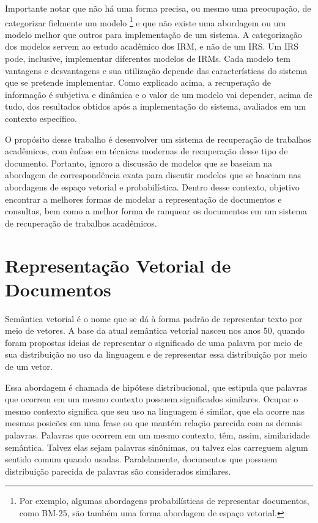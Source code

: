 \documentclass[
	12pt,				%
	openright,			%
	oneside,			%
	a4paper,			%
	english,			%
	french,				%
	spanish,			%
	brazil				%
	]{abntex2}
\begin{document}
Importante notar que não há uma forma precisa, ou mesmo uma preocupação, de categorizar fielmente um modelo
\footnote{Por exemplo, algumas abordagens probabilísticas de representar documentos, como BM-25, são também uma forma abordagem de espaço vetorial.}
e que não existe uma abordagem ou um modelo melhor que outros para implementação de um sistema.
A categorização dos modelos servem ao estudo acadêmico dos IRM, e não de um IRS.
Um IRS pode, inclusive, implementar diferentes modelos de IRMs.
Cada modelo tem vantagens e desvantagens e sua utilização depende das características do sistema que se pretende implementar.
Como explicado acima, a recuperação de informação é subjetiva e dinâmica e o valor de um modelo vai depender, acima de tudo,
dos resultados obtidos após a implementação do sistema, avaliados em um contexto específico.

O propósito desse trabalho é desenvolver um sistema de recuperação de trabalhos acadêmicos, com ênfase em técnicas modernas
de recuperação desse tipo de documento.
Portanto, ignoro a discussão de modelos que se baseiam na abordagem de correspondência exata para discutir modelos que se
baseiam nas abordagens de espaço vetorial e probabilística.
Dentro desse contexto, objetivo encontrar a melhores formas de modelar a representação de documentos e consultas, bem
como a melhor forma de ranquear os documentos em um sistema de recuperação de trabalhos acadêmicos.

\section{Representação Vetorial de Documentos}\label{sec:representacao-vetorial-de-documentos}

Semântica vetorial é o nome que se dá à forma padrão de representar texto por meio de vetores.
A base da atual semântica vetorial nasceu nos anos 50, quando foram propostas ideias de representar
o significado de uma palavra por meio de sua distribuição no uso da linguagem e de representar essa distribuição por
meio de um vetor.
\cite{JurafskyMartin2023}

Essa abordagem é chamada de hipótese distribucional, que estipula que palavras que ocorrem em um mesmo contexto possuem significados similares. \cite{PilehvarCamacho-Collados2022}
Ocupar o mesmo contexto significa que seu uso na linguagem é similar, que ela ocorre nas mesmas posicões em uma frase ou que mantém relação parecida com as demais palavras.
Palavras que ocorrem em um mesmo contexto, têm, assim, similaridade semântica. Talvez elas sejam palavras sinônimas,
ou talvez elas carreguem algum sentido comum quando usadas.
Paralelamente, documentos que possuem distribuição parecida de palavras são considerados similares.
\end{document}
